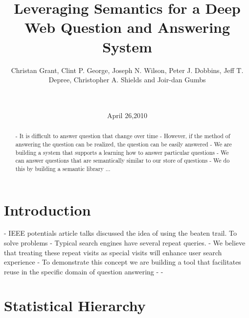 \documentclass{www2010-submission}
\begin{document}
\title{Leveraging Semantics for a Deep Web Question and Answering System} 
\author{
	 \alignauthor Christan Grant, Clint P. George, Joseph N. Wilson, Peter J. Dobbins, Jeff T. Depree, Christopher A. Shields and Joir-dan Gumbs\\
	  \\  \\
}

\date{April 26,2010}

\maketitle

\begin{abstract}
- It is difficult to answer question that change over time
- However, if the method of answering the question can be realized, the question can be easily answered
- We are building a system that supports a learning how to answer particular questions
- We can answer questions that are semantically similar to our store of questions
- We do this by building a semantic library ...
\end{abstract}




\section{Introduction}
- IEEE potentials article talks discussed the idea of using the beaten trail. \cite{5379671} To solve problems
- Typical search engines have several repeat queries.
- We believe that treating these repeat visits as special visits will enhance user search experience
- To demonstrate this concept we are building a tool that facilitates reuse in the specific domain of question answering
- 
- 

\section{Statistical Hierarchy}
\end{document}

